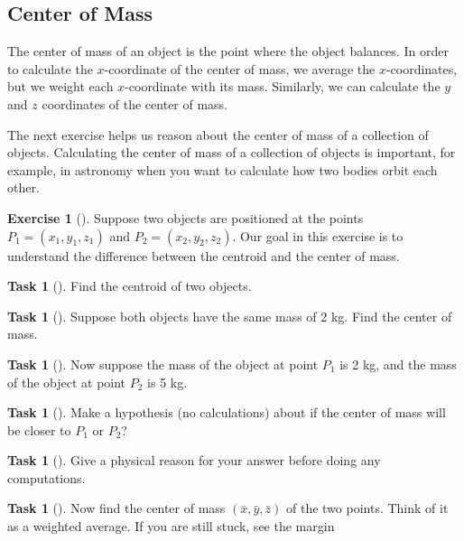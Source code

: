 \documentclass[10pt,]{book}
\theoremstyle{plain}
\theoremstyle{definition}
\theoremstyle{definition}
\theoremstyle{definition}
\theoremstyle{definition}
\newtheorem{exploration}[project]{Exercise}
\newtheorem{task}[project]{Task}
\theoremstyle{definition}
\numberwithin{equation}{section}
\begin{document}
\subsection[{Center of Mass}]{Center of Mass}\label{subsection-31}
The center of mass of an object is the point where the object balances. In order to calculate the \(x\)-coordinate of the center of mass, we average the \(x\)-coordinates, but we weight each \(x\)-coordinate with its mass. Similarly, we can calculate the \(y\) and \(z\) coordinates of the center of mass.%
\par
The next exercise helps us reason about the center of mass of a collection of objects. Calculating the center of mass of a collection of objects is important, for example, in astronomy when you want to calculate how two bodies orbit each other.%
\begin{exploration}[]\label{center_of_mass_with_two_points}
Suppose two objects are positioned at the points \(P_1=(x_1,y_1,z_1)\) and \(P_2=(x_2,y_2,z_2)\). Our goal in this exercise is to understand the difference between the centroid and the center of mass.%
\begin{task}[]\label{task-564}
Find the centroid of two objects.%
\end{task}
\begin{task}[]\label{task-565}
Suppose both objects have the same mass of 2 kg.  Find the center of mass.%
\end{task}
\begin{task}[]\label{task-566}
Now suppose the mass of the object at point \(P_1\) is 2 kg, and the mass of the object at point \(P_2\) is 5 kg.%
\begin{task}[]\label{task-567}
Make a hypothesis (no calculations) about if the center of mass will be closer to \(P_1\) or \(P_2\)?%
\end{task}
\begin{task}[]\label{task-568}
Give a physical reason for your answer before doing any computations.%
\end{task}
\begin{task}[]\label{task-569}
Now find the center of mass \((\bar x, \bar y, \bar z)\) of the two points. Think of it as a weighted average. If you are still stuck, see the margin%
\end{task}
\end{task}
\end{exploration}
\end{document}
